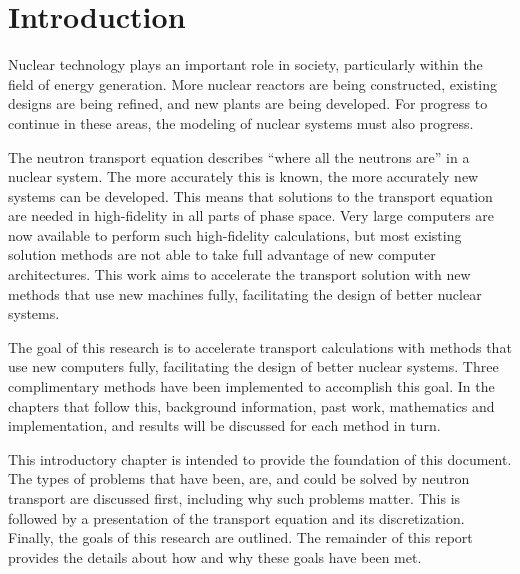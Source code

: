 
\chapter{Introduction}
\label{sec:Chp1}

Nuclear technology plays an important role in society, particularly within the field of energy generation. More nuclear reactors are being constructed, existing designs are being refined, and new plants are being developed. For progress to continue in these areas, the modeling of nuclear systems must also progress. 

The neutron transport equation describes ``where all the neutrons are'' in a nuclear system. The more accurately this is known, the more accurately new systems can be developed. This means that solutions to the transport equation are needed in high-fidelity in all parts of phase space. Very large computers are now available to perform such high-fidelity calculations, but most existing solution methods are not able to take full advantage of new computer architectures. This work aims to accelerate the transport solution with new methods that use new machines fully, facilitating the design of better nuclear systems. 

The goal of this research is to accelerate transport calculations with methods that use new computers fully, facilitating the design of better nuclear systems. Three complimentary methods have been implemented to accomplish this goal. In the chapters that follow this, background information, past work, mathematics and implementation, and results will be discussed for each method in turn. 

This introductory chapter is intended to provide the foundation of this document. The types of problems that have been, are, and could be solved by neutron transport are discussed first, including why such problems matter. This is followed by a presentation of the transport equation and its discretization. Finally, the goals of this research are outlined. The remainder of this report provides the details about how and why these goals have been met. 

